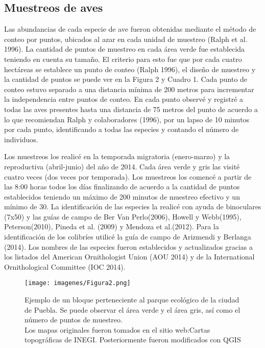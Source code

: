 \documentclass[letterpaper,12pt]{article}
\begin{document}
\subsection{Muestreos de aves}
Las abundancias de cada especie de ave fueron obtenidas mediante el método de conteo por puntos, ubicados al azar en cada unidad de muestreo (Ralph et al. 1996). La cantidad  de puntos de muestreo en cada área verde fue establecida  teniendo en cuenta su tamaño. El criterio para esto fue que por cada cuatro hectáreas se establece un punto de conteo (Ralph 1996), el diseño de muestreo y la cantidad de puntos se puede ver en la Figura 2 y Cuadro 1. Cada punto de conteo estuvo separado a una distancia mínima de 200 metros para incrementar la independencia entre puntos de conteo. En cada punto observé y registré a todas las aves presentes hasta una distancia de 75 metros del punto de acuerdo a lo que recomiendan Ralph y colaboradores (1996), por un lapso de 10 minutos por cada punto, identificando a todas las especies y contando el número de individuos.

Los muestreos los realicé en la temporada migratoria (enero-marzo) y la reproductiva (abril-junio) del año de 2014. Cada área verde y gris  las visité cuatro veces (dos veces por temporada). Los muestreos los comencé a partir de las 8:00 horas todos los días finalizando de acuerdo a la cantidad de puntos establecidos teniendo un máximo de 200 minutos de muestreo efectivo y un mínimo de 30. 
La identificación de las especies la realicé con ayuda de  binoculares (7x50) y las guías de campo de Ber Van Perlo(2006), Howell y Webb(1995),
Peterson(2010), Pineda et al. (2009) y Mendoza et al.(2012).
Para la identificación  de los colibríes utilicé la guía de campo de Arizmendi y Berlanga (2014). Los nombres de las  especies fueron establecidos y actualizados gracias a los listados del American Ornithologist Union (AOU 2014) y de la International Ornithological Committee (IOC 2014).
\begin{center}
\begin{figure}[h!]
\texttt{[image: imagenes/Figura2.png]}\\
\caption[Diseño del muestreo]{ Ejemplo de un bloque perteneciente al parque ecológico de la ciudad de Puebla.  
Se puede observar el área verde y el área gris, así como el número de puntos de muestreo. \\ Los mapas originales fueron tomados en el sitio web:Cartas topográficas de INEGI.  Posteriormente fueron modificados con QGIS}
\end{figure}
\end{center}
\end{document}
